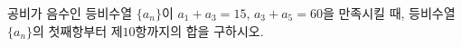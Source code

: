 공비가 음수인 등비수열 $\{a_n\}$이 $a_1+a_3=15$, $a_3+a_5=60$을 만족시킬 때, 등비수열 $\{a_n\}$의 첫째항부터 제$10$항까지의 합을 구하시오.
